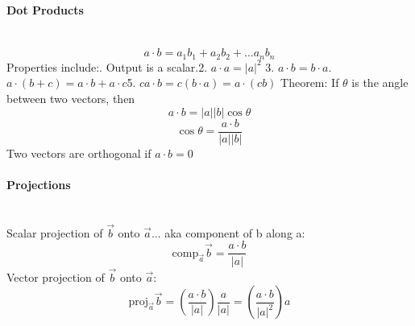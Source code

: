 \documentclass{article}
\begin{document}
\paragraph{Dot Products}\mbox{}\\
\begin{equation}
    \label{eq:Dot Product}
    a \cdot b = a_1b_1 + a_2b_2 +...a_nb_n
\end{equation}
Properties include:. Output is a scalar.\hspace{1cm}2. \(a \cdot a = |a|^2\)\hspace{1cm}
3. \(a \cdot b = b \cdot a\)\hspace{1cm}. \(a \cdot (b+c) = a \cdot b + a \cdot c\)\hspace{1cm}5. \(ca \cdot b = c(b \cdot a) = a \cdot (cb)\)
\newline\newline
Theorem: If \(\theta\) is the angle between two vectors, then\newline
\begin{equation}
    \label{eq: Theta between two vectors}
    a \cdot b = |a||b|\cos{\theta}
\end{equation}
\begin{equation}
    \label{eq: Theta dot product 2}
    \cos{\theta} = \frac{a \cdot b}{|a||b|} 
\end{equation}
\newline
Two vectors are orthogonal if \(a \cdot b = 0\)\newline

\paragraph{Projections}\mbox{}\\
Scalar projection of \(\vec{b}\) onto \(\vec{a}\)... aka component of b along a: 
\begin{equation}
    \label{eq: scalar projection}
    \text{comp}_{\vec{a}}{\vec{b}} = \frac{a \cdot b}{|a|}
\end{equation}
\newline
Vector projection of \(\vec{b}\) onto \(\vec{a}\): 
\begin{equation}
    \label{eq: vector projection}
    \text{proj}_{\vec{a}}{\vec{b}} = \left(\frac{a \cdot b}{|a|}\right) \frac{a}{|a|} 
    = \left(\frac{a \cdot b}{|a|^2}\right) a
\end{equation}
\end{document}
